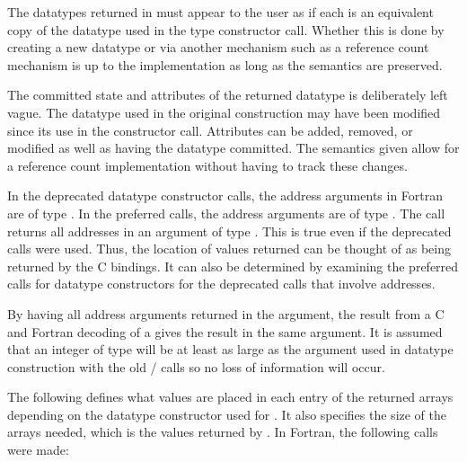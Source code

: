\begin{implementors}
The datatypes returned in  must appear to the
user as if each is an equivalent copy of the datatype used in the type
constructor call.
Whether this is done by
creating a new datatype or via another mechanism such as a reference
count mechanism is up to the implementation as long as the semantics
are preserved.
\end{implementors}

\begin{rationale}
The committed state and attributes of the returned datatype is
deliberately left vague.  The datatype used in the original
construction may have been modified since its use in the constructor
call.  Attributes can be added, removed, or modified as well as having
the datatype committed.  The semantics given allow for a
reference count implementation without having to track these changes.
\end{rationale}

In the
deprecated
 datatype constructor calls, the address arguments in Fortran are of
type .  In the
preferred
calls, the address arguments are of
type .  The call
 returns all addresses in an argument
of type .  This is true even if the
deprecated
 calls were used.  Thus, the location of values returned can
be thought of as being returned by the C bindings.  It can also be
determined by examining the
preferred
 calls for datatype constructors
for the
deprecated
calls that involve addresses.

\begin{rationale}
By having all address arguments returned in the
 argument, the result from a C and Fortran
decoding of a  gives the result in the same
argument.  It is assumed that an integer
of type  will be at least as large as
the  argument used in datatype construction with the old \mpii/
calls so no loss of information will occur.
\end{rationale}

The following defines what values are placed in each entry of the
returned arrays depending on the datatype constructor used for
.  It also specifies the size of the arrays needed,
which is the values returned by .
In Fortran, the following calls were made:

